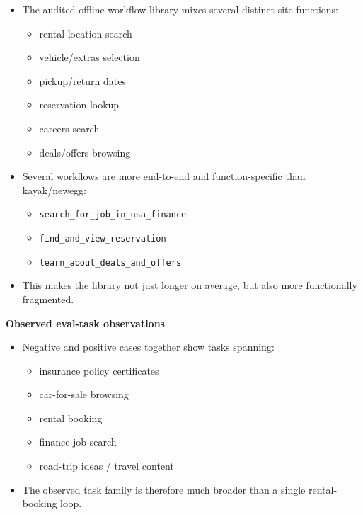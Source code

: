\begin{itemize}
\tightlist
\item
  The audited offline workflow library mixes several distinct site
  functions:

  \begin{itemize}
  \tightlist
  \item
    rental location search
  \item
    vehicle/extras selection
  \item
    pickup/return dates
  \item
    reservation lookup
  \item
    careers search
  \item
    deals/offers browsing
  \end{itemize}
\item
  Several workflows are more end-to-end and function-specific than
  kayak/newegg:

  \begin{itemize}
  \tightlist
  \item
    \texttt{search\_for\_job\_in\_usa\_finance}
  \item
    \texttt{find\_and\_view\_reservation}
  \item
    \texttt{learn\_about\_deals\_and\_offers}
  \end{itemize}
\item
  This makes the library not just longer on average, but also more
  functionally fragmented.
\end{itemize}

\textbf{Observed eval-task observations}

\begin{itemize}
\tightlist
\item
  Negative and positive cases together show tasks spanning:

  \begin{itemize}
  \tightlist
  \item
    insurance policy certificates
  \item
    car-for-sale browsing
  \item
    rental booking
  \item
    finance job search
  \item
    road-trip ideas / travel content
  \end{itemize}
\item
  The observed task family is therefore much broader than a single
  rental-booking loop.
\end{itemize}

